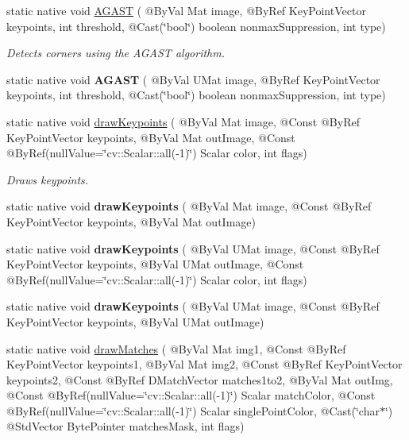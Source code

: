 \begin{DoxyCompactItemize}
\item 
static native void \hyperlink{group__features2d__main_ga2126ee1b1b70316ae0fd6ffb3d2d51bc}{A\+G\+A\+ST} ( @By\+Val Mat image, @By\+Ref Key\+Point\+Vector keypoints, int threshold, @Cast(\char`\"{}bool\char`\"{}) boolean nonmax\+Suppression, int type)
\begin{DoxyCompactList}\small\item\em Detects corners using the A\+G\+A\+ST algorithm. \end{DoxyCompactList}\item 
static native void {\bfseries A\+G\+A\+ST} ( @By\+Val U\+Mat image, @By\+Ref Key\+Point\+Vector keypoints, int threshold, @Cast(\char`\"{}bool\char`\"{}) boolean nonmax\+Suppression, int type)
\item 
static native void \hyperlink{group__features2d__draw_gab17ce5fe7286fa915dae6cdf8cb80740}{draw\+Keypoints} ( @By\+Val Mat image, @Const @By\+Ref Key\+Point\+Vector keypoints, @By\+Val Mat out\+Image, @Const @By\+Ref(null\+Value=\char`\"{}cv\+::\+Scalar\+::all(-\/1)\char`\"{}) Scalar color, int flags)
\begin{DoxyCompactList}\small\item\em Draws keypoints. \end{DoxyCompactList}\item 
static native void {\bfseries draw\+Keypoints} ( @By\+Val Mat image, @Const @By\+Ref Key\+Point\+Vector keypoints, @By\+Val Mat out\+Image)
\item 
static native void {\bfseries draw\+Keypoints} ( @By\+Val U\+Mat image, @Const @By\+Ref Key\+Point\+Vector keypoints, @By\+Val U\+Mat out\+Image, @Const @By\+Ref(null\+Value=\char`\"{}cv\+::\+Scalar\+::all(-\/1)\char`\"{}) Scalar color, int flags)
\item 
static native void {\bfseries draw\+Keypoints} ( @By\+Val U\+Mat image, @Const @By\+Ref Key\+Point\+Vector keypoints, @By\+Val U\+Mat out\+Image)
\item 
static native void \hyperlink{group__features2d__draw_gac84f37b93a8b6d5358211ec9b6d4799e}{draw\+Matches} ( @By\+Val Mat img1, @Const @By\+Ref Key\+Point\+Vector keypoints1, @By\+Val Mat img2, @Const @By\+Ref Key\+Point\+Vector keypoints2, @Const @By\+Ref D\+Match\+Vector matches1to2, @By\+Val Mat out\+Img, @Const @By\+Ref(null\+Value=\char`\"{}cv\+::\+Scalar\+::all(-\/1)\char`\"{}) Scalar match\+Color, @Const @By\+Ref(null\+Value=\char`\"{}cv\+::\+Scalar\+::all(-\/1)\char`\"{}) Scalar single\+Point\+Color, @Cast(\char`\"{}char$\ast$\char`\"{}) @Std\+Vector Byte\+Pointer matches\+Mask, int flags)

\end{DoxyCompactItemize}
